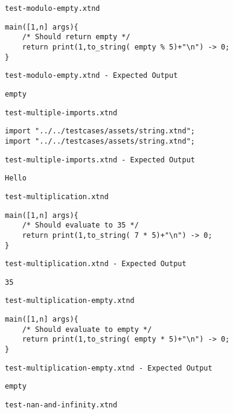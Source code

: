 \medskip \noindent \texttt{test-modulo-empty.xtnd}


\begin{lstlisting}
main([1,n] args){
	/* Should return empty */
	return print(1,to_string( empty % 5)+"\n") -> 0;
}
\end{lstlisting}


\medskip \noindent \texttt{test-modulo-empty.xtnd - Expected Output}


\begin{lstlisting}
empty
\end{lstlisting}


\medskip \noindent \texttt{test-multiple-imports.xtnd}


\begin{lstlisting}
import "../../testcases/assets/string.xtnd";
import "../../testcases/assets/string.xtnd";
\end{lstlisting}


\medskip \noindent \texttt{test-multiple-imports.xtnd - Expected Output}


\begin{lstlisting}
Hello
\end{lstlisting}


\medskip \noindent \texttt{test-multiplication.xtnd}


\begin{lstlisting}
main([1,n] args){
	/* Should evaluate to 35 */
	return print(1,to_string( 7 * 5)+"\n") -> 0;
}
\end{lstlisting}


\medskip \noindent \texttt{test-multiplication.xtnd - Expected Output}


\begin{lstlisting}
35
\end{lstlisting}


\medskip \noindent \texttt{test-multiplication-empty.xtnd}


\begin{lstlisting}
main([1,n] args){
	/* Should evaluate to empty */
	return print(1,to_string( empty * 5)+"\n") -> 0;
}
\end{lstlisting}


\medskip \noindent \texttt{test-multiplication-empty.xtnd - Expected Output}


\begin{lstlisting}
empty
\end{lstlisting}


\medskip \noindent \texttt{test-nan-and-infinity.xtnd}


